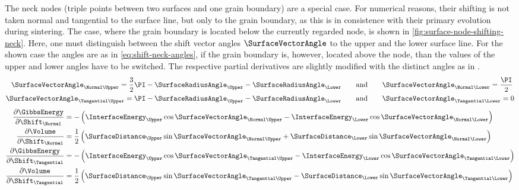 The neck nodes (triple points between two surfaces and one grain boundary) are a special case.
For numerical reasons, their shifting is not taken normal and tangential to the surface line, but only to the grain boundary, as this is in consistence with their primary evolution during sintering.
The case, where the grain boundary is located below the currently regarded node, is shown in \cref{fig:surface-node-shifting-neck}.
Here, one must distinguish between the shift vector angles $\SurfaceVectorAngle$ to the upper and the lower surface line.
For the shown case the angles are as in \cref{eq:shift-neck-angles}, if the grain boundary is, however, located above the node, than the values of the upper and lower angles have to be switched.
The respective partial derivatives are slightly modified with the distinct angles as in .
\begin{align}
    \SurfaceVectorAngle_{\Normal\Upper} = \frac32 \PI - \SurfaceRadiusAngle_{\Upper} - \SurfaceRadiusAngle_{\Lower} \qquad &\text{and} \qquad \SurfaceVectorAngle_{\Normal\Lower} = \frac\PI2 \\
    \SurfaceVectorAngle_{\Tangential\Upper} = \PI - \SurfaceRadiusAngle_{\Upper} - \SurfaceRadiusAngle_{\Lower} \qquad &\text{and} \qquad \SurfaceVectorAngle_{\Tangential\Lower} = 0
    \label{eq:shift-neck-angles}
\end{align}
\begin{align}
    \frac{\partial \GibbsEnergy}{\partial {\Shift}_{\Normal}} &= -\left( {\InterfaceEnergy}_{\Upper} \cos \SurfaceVectorAngle_{\Normal\Upper} - {\InterfaceEnergy}_{\Lower} \cos \SurfaceVectorAngle_{\Normal\Lower} \right)
    \label{eq:gibbs-partial-neck-normal} \\
    \frac{\partial \Volume}{\partial {\Shift}_{\Normal}} &= \frac{1}{2} \left( \SurfaceDistance_{\Upper} \sin \SurfaceVectorAngle_{\Normal\Upper} + \SurfaceDistance_{\Lower} \sin \SurfaceVectorAngle_{\Normal\Lower}\right)
    \label{eq:volume-partial-neck-normal} \\
    \frac{\partial \GibbsEnergy}{\partial {\Shift}_{\Tangential}} &= -\left( {\InterfaceEnergy}_{\Upper} \cos \SurfaceVectorAngle_{\Tangential\Upper} - {\InterfaceEnergy}_{\Lower} \cos \SurfaceVectorAngle_{\Tangential\Lower}\right)
    \label{eq:gibbs-partial-neck-tangential} \\
    \frac{\partial \Volume}{\partial {\Shift}_{\Tangential}} &= \frac{1}{2} \left( \SurfaceDistance_{\Upper} \sin \SurfaceVectorAngle_{\Tangential\Upper} - \SurfaceDistance_{\Lower} \sin \SurfaceVectorAngle_{\Tangential\Lower}\right)
    \label{eq:volume-partial-neck-tangential}
\end{align}
